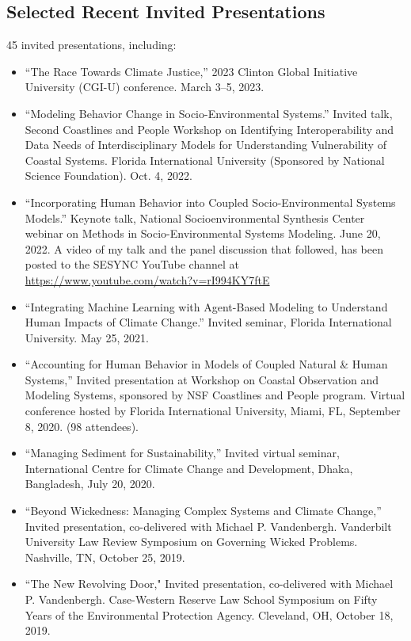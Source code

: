 \documentclass[10pt]{article}
\begin{document}
  \subsection{Selected Recent Invited Presentations}
   45 invited presentations, including:
   \begin{itemize}
     \item ``The Race Towards Climate Justice,'' 2023 Clinton Global
       Initiative University (CGI-U) conference.
       March 3--5, 2023.
\item ``Modeling Behavior Change in Socio-Environmental Systems.''
Invited talk, Second Coastlines and People Workshop on Identifying Interoperability and Data Needs of Interdisciplinary Models for
Understanding Vulnerability of Coastal Systems. Florida International
University (Sponsored by National Science Foundation). Oct. 4, 2022.
\item ``Incorporating Human Behavior into Coupled Socio-Environmental Systems
Models.'' Keynote talk, National Socioenvironmental Synthesis Center
webinar on Methods in Socio-Environmental Systems Modeling.
June 20, 2022. A video of my talk and the panel discussion that followed, has been posted to the
SESYNC YouTube channel at \url{https://www.youtube.com/watch?v=rI994KY7ftE}
\item ``Integrating Machine Learning with Agent-Based Modeling to Understand
Human Impacts of Climate Change.'' Invited seminar, Florida International
University. May 25, 2021.
\item ``Accounting for Human Behavior in Models of Coupled Natural \& Human
Systems,'' Invited presentation at Workshop on Coastal Observation and
Modeling Systems, sponsored by NSF Coastlines and People program. Virtual
conference hosted by Florida International University, Miami, FL,
September 8, 2020. (98 attendees).
\item ``Managing Sediment for Sustainability,'' Invited virtual seminar,
International Centre for Climate Change and Development, Dhaka, Bangladesh,
July 20, 2020.
\item ``Beyond Wickedness: Managing Complex Systems and Climate Change,''
Invited presentation, co-delivered with Michael P. Vandenbergh. Vanderbilt
University Law Review Symposium on Governing Wicked Problems. Nashville, TN,
October 25, 2019.
\item ``The New Revolving Door," Invited presentation, co-delivered with
Michael P. Vandenbergh. Case-Western Reserve Law School Symposium on Fifty
Years of the Environmental Protection Agency. Cleveland, OH, October 18, 2019.

\end{itemize}
\end{document}
